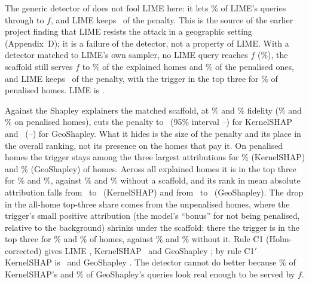 The generic detector of \citet{slack2020fooling} does not fool LIME here: it lets \FLIMEGenLeak\% of LIME's queries
through to $f$, and LIME keeps \FLIMEGenKept\ of the penalty. This is the source of the earlier project finding that
LIME resists the attack in a geographic setting (Appendix~D); it is a failure of the detector, not a property of
LIME. With a detector matched to LIME's own sampler, no LIME query reaches $f$ (\FLIMEMatLeak\%), the scaffold still
serves $f$ to \FLIMEMatFid\% of the explained homes and \FLIMEMatFidPen\% of the penalised ones, and LIME keeps
\FLIMEMatKept\ of the penalty, with the trigger in the top three for \FLIMEMatTopPen\% of penalised homes. LIME is
\RuleConePrimeFeatureLIME.

Against the Shapley explainers the matched scaffold, at \FKernelSHAPMatFid\% and \FGeoShapleyMatFid\% fidelity
(\FKernelSHAPMatFidPen\% and \FGeoShapleyMatFidPen\% on penalised homes), cuts the penalty to \FKernelSHAPMatKept\
(95\% interval \FKernelSHAPMatKeptLo--\FKernelSHAPMatKeptHi) for KernelSHAP and \FGeoShapleyMatKept\
(\FGeoShapleyMatKeptLo--\FGeoShapleyMatKeptHi) for GeoShapley. What it hides is the size of the penalty and its
place in the overall ranking, not its presence on the homes that pay it. On penalised homes the trigger stays among
the three largest attributions for \FKernelSHAPMatTopPen\% (KernelSHAP) and \FGeoShapleyMatTopPen\% (GeoShapley) of
homes. Across all explained homes it is in the top three for \FKernelSHAPMatTop\% and \FGeoShapleyMatTop\%, against
\FKernelSHAPBiasedTop\% and \FGeoShapleyBiasedTop\% without a scaffold, and its rank in mean absolute attribution falls
from \FKernelSHAPBiasedRank\ to \FKernelSHAPMatRank\ (KernelSHAP) and from \FGeoShapleyBiasedRank\ to
\FGeoShapleyMatRank\ (GeoShapley). The drop in the all-home top-three share comes from the unpenalised homes,
where the trigger's small positive
attribution (the model's ``bonus'' for not being penalised, relative to the background) shrinks under the scaffold:
there the trigger is in the top three for \FKernelSHAPMatTopUnpen\% and \FGeoShapleyMatTopUnpen\% of homes, against
\FKernelSHAPBiasedTopUnpen\% and \FGeoShapleyBiasedTopUnpen\% without it. Rule C1 (Holm-corrected)
gives LIME \RuleConeFeatureLIME, KernelSHAP \RuleConeFeatureKernelSHAP\ and GeoShapley \RuleConeFeatureGeoShapley;
by rule C1$'$ KernelSHAP is \RuleConePrimeFeatureKernelSHAP\ and GeoShapley \RuleConePrimeFeatureGeoShapley. The detector cannot do better because \FKernelSHAPMatLeak\% of KernelSHAP's and
\FGeoShapleyMatLeak\% of GeoShapley's queries look real enough to be served by $f$.

